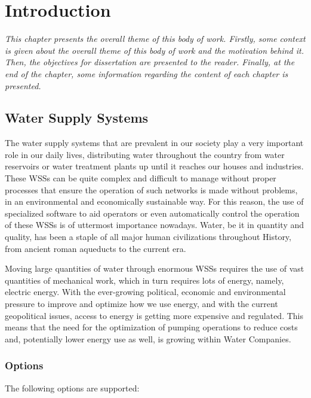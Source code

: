 \chapter{Introduction}
\label{intro}

\textit{This chapter presents the overall theme of this body of work. Firstly, some context is given about the overall theme of this body of work and the motivation behind it. Then, the objectives for dissertation are presented to the reader. Finally, at the end of the chapter, some information regarding the content of each chapter is presented.}


\section{Water Supply Systems}
\label{c1:s:water-supply-systems}

The water supply systems that are prevalent in our society play a very important role in our daily lives, distributing water throughout the country from water reservoirs or water treatment plants up until it reaches our houses and industries. These WSSs can be quite complex and difficult to manage without proper processes that ensure the operation of such networks is made without problems, in an environmental and economically sustainable way. For this reason, the use of specialized software to aid operators or even automatically control the operation of these WSSs is of uttermost importance nowadays. Water, be it in quantity and quality, has been a staple of all major human civilizations throughout History, from ancient roman aqueducts to the current era. 

Moving large quantities of water through enormous WSSs requires the use of vast quantities of mechanical work, which in turn requires lots of energy, namely, electric energy. With the ever-growing political, economic and environmental pressure to improve and optimize how we use energy, and with the current geopolitical issues, access to energy is getting more expensive and regulated. This means that the need for the optimization of pumping operations to reduce costs and, potentially lower energy use as well, is growing within Water Companies.



\subsection{Options}
\label{c1:ss:options}

The following options are supported:

